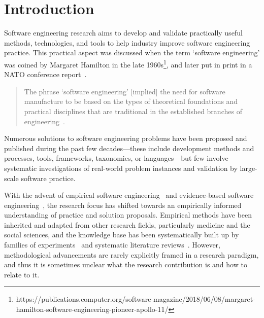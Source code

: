 \documentclass[graybox]{svmult}
\begin{document}
\section{Introduction}
\label{sec:intro}

Software engineering research aims to develop and validate practically useful methods, technologies, and tools to help industry improve software engineering practice. This practical aspect was discussed when the term `software engineering' was coined by Margaret Hamilton in the late 1960s\footnote{https://publications.computer.org/software-magazine/2018/06/08/margaret-hamilton-software-engineering-pioneer-apollo-11/}, and later put in print in a NATO conference report~\cite{Nato1968}. 

\begin{quote}
{The phrase `software engineering'  [implied] the need for software manufacture to be based on the types of theoretical foundations and practical disciplines that are traditional in the established branches of engineering}~\cite[p. 13]{Nato1968}. 
\end{quote}

Numerous solutions to software engineering problems have been proposed and published during the past few decades---these include development methods and processes, tools, frameworks, taxonomies, or languages---but few involve systematic investigations of real-world problem instances and validation by large-scale software practice.

With the advent of empirical software engineering~\cite{Basili86} and evidence-based software engineering~\cite{Kitchenham04}, the research focus has shifted towards an empirically informed understanding of practice and solution proposals. Empirical methods have been inherited and adapted from other research fields, particularly medicine and the social sciences, and the knowledge base has been systematically built up by families of experiments~\cite{Basili99} and systematic literature reviews~\cite{Kitchenham15}. However, methodological advancements are rarely explicitly framed in a research paradigm, and thus it is sometimes unclear what the research contribution is and how to relate to it. 
\end{document}
